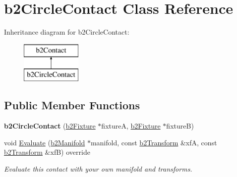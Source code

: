\hypertarget{classb2CircleContact}{}\section{b2\+Circle\+Contact Class Reference}
\label{classb2CircleContact}
Inheritance diagram for b2\+Circle\+Contact\+:\begin{figure}[H]
\begin{center}
\leavevmode
\includegraphics[height=2.000000cm]{classb2CircleContact}
\end{center}
\end{figure}
\subsection*{Public Member Functions}
\begin{DoxyCompactItemize}
\item 
\mbox{\label{classb2CircleContact_a77e06c857edb2ca171340898f09ef789}} 
{\bfseries b2\+Circle\+Contact} (\mbox{\hyperlink{classb2Fixture}{b2\+Fixture}} $\ast$fixtureA, \mbox{\hyperlink{classb2Fixture}{b2\+Fixture}} $\ast$fixtureB)
\item 
\mbox{\label{classb2CircleContact_a90036965fd66469e916a5afc6c244092}} 
void \mbox{\hyperlink{classb2CircleContact_a90036965fd66469e916a5afc6c244092}{Evaluate}} (\mbox{\hyperlink{structb2Manifold}{b2\+Manifold}} $\ast$manifold, const \mbox{\hyperlink{structb2Transform}{b2\+Transform}} \&xfA, const \mbox{\hyperlink{structb2Transform}{b2\+Transform}} \&xfB) override
\begin{DoxyCompactList}\small\item\em Evaluate this contact with your own manifold and transforms. \end{DoxyCompactList}\end{DoxyCompactItemize}
